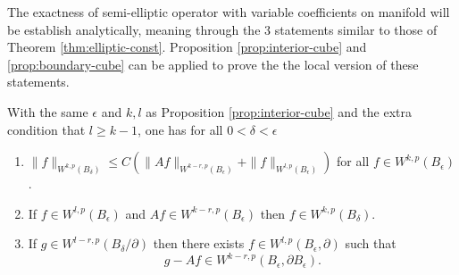 The exactness of semi-elliptic operator with variable coefficients on manifold will be
establish analytically, meaning through the 3 statements similar to those of Theorem \ref{thm:elliptic-const}.
Proposition \ref{prop:interior-cube} and \ref{prop:boundary-cube} can be applied to prove the
the local version of these statements.

\begin{lemma}
\label{lem:ell-loc-cube}
With the same \(\epsilon\) and \(k,l\) as Proposition \ref{prop:interior-cube} and the
extra condition that \(l\geq k-1\), one has for all \(0< \delta <\epsilon\)
\begin{enumerate}
\item \(\|f\|_{W^{k,p}(B_\delta)}\leq C \left( \|Af\|_{W^{k-r,p}(B_\epsilon)} +
   \|f\|_{W^{l,p}(B_\epsilon)} \right)\) for all \(f\in W^{k,p}(B_\epsilon)\).
\item If \(f\in W^{l,p}(B_\epsilon)\) and \(Af\in W^{k-r,p}(B_\epsilon)\) then \(f\in W^{k,p}(B_\delta)\).
\item If \(g\in W^{l-r,p}(B_\delta/ \partial)\) then there exists \(f\in
   W^{l,p}(B_\epsilon, \partial)\) such that
\[
    g-Af \in W^{k-r,p}(B_\epsilon, \partial B_\epsilon).
   \]
\end{enumerate}
\end{lemma}


